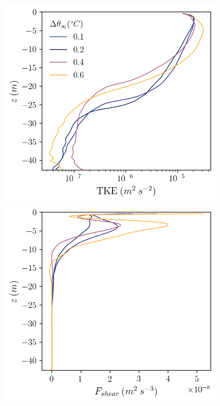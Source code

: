 \documentclass[draft,jgrga]{agutexSI2019}
\begin{document}
\begin{figure}
    \centering
    \begin{minipage}{0.5\textwidth}
        \includegraphics[trim={0 0 0 0},clip, width=\textwidth]{Figures/eres_cmp_dT_43h_tav13h_z_profile.png}
    \end{minipage}%
    \begin{minipage}{0.5\textwidth}
        \includegraphics[trim={0 0 0 0},clip,width=\textwidth]{Figures/Fshear_cmp_dT_43h_tav13h_z_profile.png}    

\end{minipage}
\end{figure}
\end{document}
